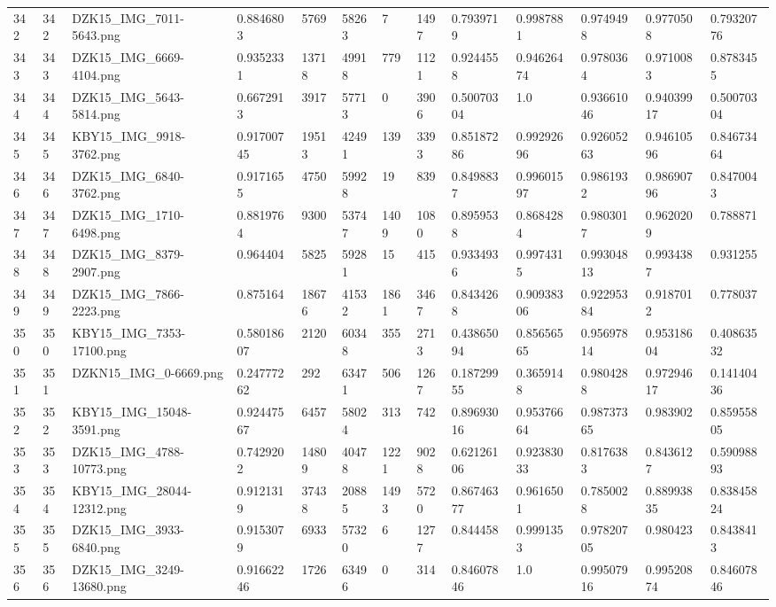 \documentclass[11pt, a4paper, twoside]{report}
\begin{document}
\begin{longtable}[c]{@{}lllllllllllll@{}}
342 & 342 & DZK15\_IMG\_7011-5643.png & 0.8846803 & 5769 & 58263 & 7 & 1497 & 0.7939719 & 0.9987881 & 0.9749498 & 0.9770508 & 0.79320776 \\
343 & 343 & DZK15\_IMG\_6669-4104.png & 0.9352331 & 13718 & 49918 & 779 & 1121 & 0.9244558 & 0.94626474 & 0.9780364 & 0.9710083 & 0.8783455 \\
344 & 344 & DZK15\_IMG\_5643-5814.png & 0.6672913 & 3917 & 57713 & 0 & 3906 & 0.50070304 & 1.0 & 0.93661046 & 0.94039917 & 0.50070304 \\
345 & 345 & KBY15\_IMG\_9918-3762.png & 0.91700745 & 19513 & 42491 & 139 & 3393 & 0.85187286 & 0.99292696 & 0.92605263 & 0.94610596 & 0.84673464 \\
346 & 346 & DZK15\_IMG\_6840-3762.png & 0.9171655 & 4750 & 59928 & 19 & 839 & 0.8498837 & 0.99601597 & 0.9861932 & 0.98690796 & 0.8470043 \\
347 & 347 & DZK15\_IMG\_1710-6498.png & 0.8819764 & 9300 & 53747 & 1409 & 1080 & 0.8959538 & 0.8684284 & 0.9803017 & 0.9620209 & 0.788871 \\
348 & 348 & DZK15\_IMG\_8379-2907.png & 0.964404 & 5825 & 59281 & 15 & 415 & 0.9334936 & 0.9974315 & 0.99304813 & 0.9934387 & 0.931255 \\
349 & 349 & DZK15\_IMG\_7866-2223.png & 0.875164 & 18676 & 41532 & 1861 & 3467 & 0.8434268 & 0.90938306 & 0.92295384 & 0.9187012 & 0.778037 \\
350 & 350 & KBY15\_IMG\_7353-17100.png & 0.58018607 & 2120 & 60348 & 355 & 2713 & 0.43865094 & 0.85656565 & 0.95697814 & 0.95318604 & 0.40863532 \\
351 & 351 & DZKN15\_IMG\_0-6669.png & 0.24777262 & 292 & 63471 & 506 & 1267 & 0.18729955 & 0.3659148 & 0.9804288 & 0.97294617 & 0.14140436 \\
352 & 352 & KBY15\_IMG\_15048-3591.png & 0.92447567 & 6457 & 58024 & 313 & 742 & 0.89693016 & 0.95376664 & 0.98737365 & 0.983902 & 0.85955805 \\
353 & 353 & DZK15\_IMG\_4788-10773.png & 0.7429202 & 14809 & 40478 & 1221 & 9028 & 0.62126106 & 0.92383033 & 0.8176383 & 0.8436127 & 0.59098893 \\
354 & 354 & KBY15\_IMG\_28044-12312.png & 0.9121319 & 37438 & 20885 & 1493 & 5720 & 0.86746377 & 0.9616501 & 0.7850028 & 0.88993835 & 0.83845824 \\
355 & 355 & DZK15\_IMG\_3933-6840.png & 0.9153079 & 6933 & 57320 & 6 & 1277 & 0.844458 & 0.9991353 & 0.97820705 & 0.980423 & 0.8438413 \\
356 & 356 & DZK15\_IMG\_3249-13680.png & 0.91662246 & 1726 & 63496 & 0 & 314 & 0.84607846 & 1.0 & 0.99507916 & 0.99520874 & 0.84607846 \\

\end{longtable}
\end{document}
